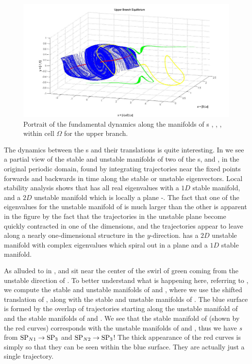 \documentclass[lineno]{jfm}
\begin{document}
  \begin{figure}[!h]
\includegraphics[width=1.1\textwidth]{june4_fig7.jpg}
  \caption{
Portrait of the fundamental dynamics along the manifolds of \stagp s 
, , ,  within cell $\Omega$ for the upper 
branch. 
   }
  \label{fig:hetero2}
 \end{figure}

The dynamics between the \stagp s and their translations is quite 
interesting. In  we see a partial view of 
the stable and unstable manifolds of two of the {\stagp}s,  and 
, in the original periodic domain, found by integrating 
trajectories near the fixed points forwards and backwards in time along 
the stable or unstable eigenvectors. Local stability analysis shows that 
 has all real eigenvalues with a $1D$ stable manifold, and a $2D$ 
unstable manifold which is locally a plane 
-. The fact that one of the eigenvalues 
for the unstable manifold of  is much larger than the other is 
apparent in the figure by the fact that the trajectories in the unstable 
plane become quickly contracted in one of the dimensions, and the 
trajectories appear to leave along a nearly one-dimensional structure in 
the $y$-direction.  has a $2D$ unstable manifold with complex 
eigenvalues which spiral out in a plane and a $1D$ stable manifold. 
 
As alluded to in ,  and  
sit near the center of the swirl of green coming from the unstable 
direction of . To better understand what is happening here, 
referring to , we compute the  stable and 
unstable manifolds of  and , where we use the shifted 
translation of , along with the stable and unstable manifolds of 
. The blue surface is formed by the overlap of trajectories 
starting along the unstable manifold of  and the stable manifolds 
of  and .  We see that the stable manifold of  
(shown by the red curves) corresponds with the unstable manifolds of 
 and , thus we have \emph{{\hc}s} from ${{\text{SP}_{N1}}}\to{\ensuremath{{\text{SP}_{3}}}}$
 and ${{\text{SP}_{N2}}}\to{\ensuremath{{\text{SP}_{3}}}}$! The thick appearance of the red curves 
is simply so that they can be seen within the blue surface. They are 
actually just a single trajectory. 
 
\end{document}
